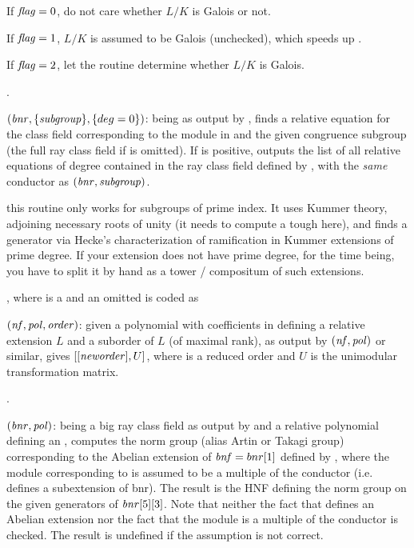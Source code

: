If $\hbox{\it f\kern0pt lag\/} = 0$, do not care whether $L/K$ is Galois or not.

If $\hbox{\it f\kern0pt lag\/} = 1$, $L/K$ is assumed to be Galois (unchecked), which speeds up
.

If $\hbox{\it f\kern0pt lag\/} = 2$, let the routine determine whether $L/K$ is Galois.

.

$(\hbox{\it bnr\/},\{\hbox{\it subgroup\/}\},\{deg=0\})$: 
being as output by , finds a relative equation for the
class field corresponding to the module in  and the given
congruence subgroup (the full ray class field if  is omitted).
If  is positive, outputs the list of all relative equations of
degree  contained in the ray class field defined by , with
the \emph{same} conductor as $(\hbox{\it bnr\/}, \hbox{\it subgroup\/})$.

 this routine only works for subgroups of prime index. It
uses Kummer theory, adjoining necessary roots of unity (it needs to compute a
tough  here), and finds a generator via Hecke's characterization
of ramification in Kummer extensions of prime degree. If your extension does
not have prime degree, for the time being, you have to split it by hand as a
tower / compositum of such extensions.

, where
 is a  and an omitted  is coded as

$(\hbox{\it nf\/},\hbox{\it pol\/},\hbox{\it order\/})$: given a polynomial
 with coefficients in  defining a relative extension $L$ and
a suborder  of $L$ (of maximal rank), as output by
$(\hbox{\it nf\/},\hbox{\it pol\/})$ or similar, gives
$[[\hbox{\it neworder\/}],U]$, where  is a reduced order and $U$ is
the unimodular transformation matrix.

.

$(\hbox{\it bnr\/},\hbox{\it pol\/})$:  being a big ray
class field as output by  and  a relative polynomial
defining an , computes the norm group (alias Artin
or Takagi group) corresponding to the Abelian extension of $\hbox{\it bnf\/}=bnr[1]$
defined by , where the module corresponding to  is assumed
to be a multiple of the conductor (i.e.~ defines a subextension of
bnr). The result is the HNF defining the norm group on the given generators
of $\hbox{\it bnr\/}[5][3]$. Note that neither the fact that  defines an
Abelian extension nor the fact that the module is a multiple of the conductor
is checked. The result is undefined if the assumption is not correct.

